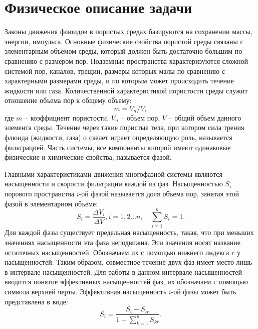 \section{Физическое описание задачи}

Законы движения флюидов в пористых средах базируются на сохранении
массы, энергии, импульса. Основные
физические свойства пористой среды связаны с элементарным
объемом среды, который должен быть достаточно большим по сравнению с размером
пор. Подземные пространства характеризуются сложной системой пор, каналов,
трещин, размеры которых малы по сравнению с характерными размерами среды, и по
которым может происходить течение жидкости или газа. Количественной
характеристикой пористости среды
служит отношение объема пор к общему объему:
%
	$$m=V_n/V,$$
%	 	
где $m$ -- коэффициент пористости, $V_n$ -- объем пор, $V$ -- общий объем
данного
элемента среды.
%
Течение через такие пористые тела, при котором сила трения флюида
(жидкости, газа) о скелет играет определяющую роль, называется фильтрацией.
Часть системы, все компоненты которой имеют
одинаковые физические и химические свойства, называется фазой. 

Главными характеристиками движения многофазной системы являются насыщенности и
скорости фильтрации каждой из фаз. Насыщенностью $S_i$  порового пространства
$i$-ой фазой называется доля объема пор, занятая этой фазой в элементарном
объеме:
%
\begin{equation} 
S_i=\frac{\Delta V_i}{\Delta V}, i=1,2\ldots n,{\quad}\sum_{i=1}^{n}S_i=1. 
\end{equation}
%
Для каждой фазы существует предельная насыщенность, такая, что при меньших
значениях насыщенности эта фаза неподвижна. Эти значения носят название остаточных 
насыщенностей. Обозначаем их с помощью нижнего индекса $r$ у насыщенностей. Таким 
образом, совместное течение двух фаз имеет место лишь в интервале насыщенностей.
Для работы в данном интервале насыщенностей вводится понятие эффективных 
насыщенностей фаз, их обозначаем с помощью символа верхней черты. Эффективная насыщенность 
$i$-ой фазы может быть представлена в виде:
$$\overline{S_i}={\frac{S_i-S_{ir}}{1-\sum\limits_{k=1}^{n}S_{kr}}}.$$

